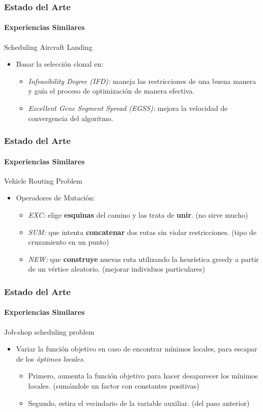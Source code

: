 \frame
{
\frametitle{Estado del Arte}
\framesubtitle{Experiencias Similares}
\begin{block}{Scheduling Aircraft Landing}
\begin{itemize}
	\item Basar la selección clonal en:
	\begin{itemize}
		\item \emph{Infeasibility Degree (IFD):}
			maneja las restricciones de una buena manera y guía el proceso de optimización de manera efectiva.
		\item \emph{Excellent Gene Segment Spread (EGSS):}
			mejora la velocidad de convergencia del algoritmo.
	\end{itemize}
\end{itemize}
\end{block}
}

\frame
{
\frametitle{Estado del Arte}
\framesubtitle{Experiencias Similares}
\begin{block}{Vehicle Routing Problem}
\begin{itemize}
	\item Operadores de Mutación:
	\begin{itemize}
		\item \emph{EXC:}
			elige \textbf{esquinas} del camino y las trata de \textbf{unir}. (no sirve mucho)
		\item \emph{SUM:}
			que intenta \textbf{concatenar} dos rutas sin violar restricciones. (tipo de cruzamiento en un punto)
		\item \emph{NEW:}
			que \textbf{construye} nuevas ruta utilizando la heurística greedy a partir de un vértice aleatorio. (mejorar individuos particulares)
	\end{itemize}
\end{itemize}
\end{block}
}

\frame
{
\frametitle{Estado del Arte}
\framesubtitle{Experiencias Similares}
\begin{block}{Job-shop scheduling problem}
\begin{itemize}
	\item Variar la función objetivo en caso de encontrar mínimos locales, para escapar de los \emph{óptimos locales}.
	\begin{itemize}
		\item Primero, aumenta la función objetivo para hacer desaparecer los mínimos locales. (sumándole un factor con constantes positivas)
		\item Segundo, estira el vecindario de la variable auxiliar. (del paso anterior)
	\end{itemize}
\end{itemize}
\end{block}
}

